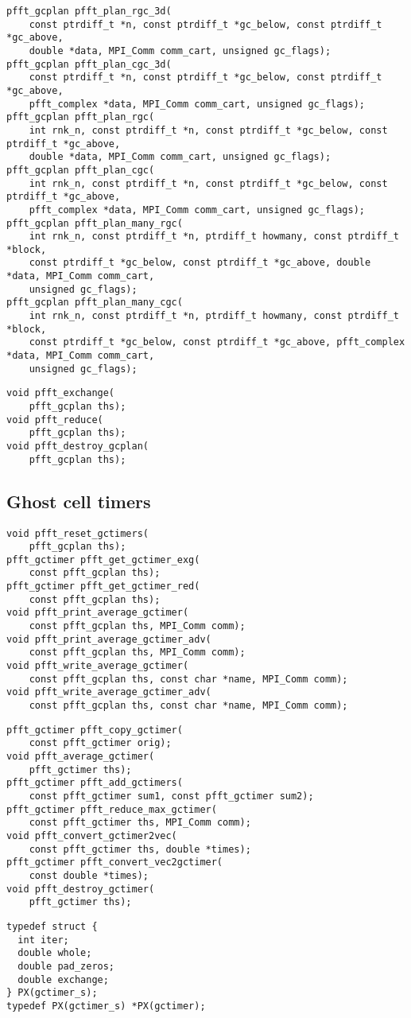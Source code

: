 \begin{lstlisting}
pfft_gcplan pfft_plan_rgc_3d(
    const ptrdiff_t *n, const ptrdiff_t *gc_below, const ptrdiff_t *gc_above,
    double *data, MPI_Comm comm_cart, unsigned gc_flags);
pfft_gcplan pfft_plan_cgc_3d(
    const ptrdiff_t *n, const ptrdiff_t *gc_below, const ptrdiff_t *gc_above,
    pfft_complex *data, MPI_Comm comm_cart, unsigned gc_flags);
pfft_gcplan pfft_plan_rgc(
    int rnk_n, const ptrdiff_t *n, const ptrdiff_t *gc_below, const ptrdiff_t *gc_above,
    double *data, MPI_Comm comm_cart, unsigned gc_flags);
pfft_gcplan pfft_plan_cgc(
    int rnk_n, const ptrdiff_t *n, const ptrdiff_t *gc_below, const ptrdiff_t *gc_above,
    pfft_complex *data, MPI_Comm comm_cart, unsigned gc_flags);
pfft_gcplan pfft_plan_many_rgc(
    int rnk_n, const ptrdiff_t *n, ptrdiff_t howmany, const ptrdiff_t *block,
    const ptrdiff_t *gc_below, const ptrdiff_t *gc_above, double *data, MPI_Comm comm_cart,
    unsigned gc_flags);
pfft_gcplan pfft_plan_many_cgc(
    int rnk_n, const ptrdiff_t *n, ptrdiff_t howmany, const ptrdiff_t *block,
    const ptrdiff_t *gc_below, const ptrdiff_t *gc_above, pfft_complex *data, MPI_Comm comm_cart,
    unsigned gc_flags);
\end{lstlisting}

\begin{lstlisting}
void pfft_exchange(
    pfft_gcplan ths);
void pfft_reduce(
    pfft_gcplan ths);
void pfft_destroy_gcplan(
    pfft_gcplan ths);
\end{lstlisting}

\subsection{Ghost cell timers}
\begin{lstlisting}
void pfft_reset_gctimers(
    pfft_gcplan ths);
pfft_gctimer pfft_get_gctimer_exg(
    const pfft_gcplan ths);
pfft_gctimer pfft_get_gctimer_red(
    const pfft_gcplan ths);
void pfft_print_average_gctimer(
    const pfft_gcplan ths, MPI_Comm comm);
void pfft_print_average_gctimer_adv(
    const pfft_gcplan ths, MPI_Comm comm);
void pfft_write_average_gctimer(
    const pfft_gcplan ths, const char *name, MPI_Comm comm);
void pfft_write_average_gctimer_adv(
    const pfft_gcplan ths, const char *name, MPI_Comm comm);
\end{lstlisting}

\begin{lstlisting}
pfft_gctimer pfft_copy_gctimer(
    const pfft_gctimer orig);
void pfft_average_gctimer(
    pfft_gctimer ths);
pfft_gctimer pfft_add_gctimers(
    const pfft_gctimer sum1, const pfft_gctimer sum2);
pfft_gctimer pfft_reduce_max_gctimer(
    const pfft_gctimer ths, MPI_Comm comm);
void pfft_convert_gctimer2vec(
    const pfft_gctimer ths, double *times);
pfft_gctimer pfft_convert_vec2gctimer(
    const double *times);
void pfft_destroy_gctimer(
    pfft_gctimer ths);
\end{lstlisting}

\begin{lstlisting}
typedef struct {
  int iter;
  double whole;
  double pad_zeros;
  double exchange;
} PX(gctimer_s);
typedef PX(gctimer_s) *PX(gctimer);
\end{lstlisting}



